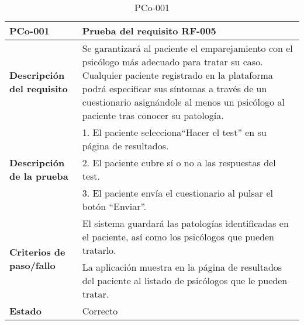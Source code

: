 \begin{table}[htpb]
\centering
\begin{tabularx}{\textwidth}{|l|X|}
\hline
\textbf{PCo-001}                                     & \textbf{Prueba del requisito RF-005}                                                                                                                                                                                                                                               \\ \hline
\textbf{Descripción del requisito}                 & Se garantizará al paciente el emparejamiento con el psicólogo más adecuado para tratar su caso. Cualquier paciente registrado en la plataforma podrá especificar sus síntomas a través de un cuestionario asignándole al menos un psicólogo al paciente tras conocer su patología. \\ \hline
\multirow{3}{*}{\textbf{Descripción de la prueba}} & 1. El paciente selecciona``Hacer el test'' en su página de resultados.                                                                                                                                                                                                              \\ \cline{2-2} 
                                                   & 2. El paciente cubre sí o no a las respuestas del test.                                                                                                                                                                                                                            \\ \cline{2-2} 
                                                   & 3. El paciente envía el cuestionario al pulsar el botón ``Enviar''.                                                                                                                                                                                                                  \\ \hline
\multirow{2}{*}{\textbf{Criterios de paso/fallo}}  & El sistema guardará las patologías identificadas en el paciente, así como los psicólogos que pueden tratarlo.                                                                                                                                                                      \\ \cline{2-2} 
                                                   & La aplicación muestra en la página de resultados del paciente al listado de psicólogos que le pueden tratar.                                                                                                                                                                       \\ \hline
\textbf{Estado}                                    & Correcto                                                                                                                                                                                                                                                                           \\ \hline
\end{tabularx}
\caption{PCo-001}
\end{table}


